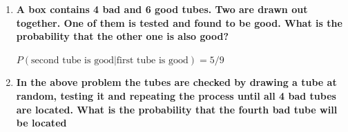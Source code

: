 \documentclass[10pt, oneside]{article}
\begin{document}
\begin{enumerate}[label=3.\arabic*]
\begin{enumerate}
	$\binom{1}{1} / \binom{4}{2} = \boxed{1/6}$
	
	\item  \begin{tcolorbox}[
	  colback=Cerulean!5!white,
	  colframe=Cerulean!75!black]
	\textbf{What is the probability that the last defective tube is obtained on the third test?}
	\end{tcolorbox}
	
	$\binom{2}{1} / \binom{4}{2} = \boxed{1/3}$
	
	\item  \begin{tcolorbox}[
	  colback=Cerulean!5!white,
	  colframe=Cerulean!75!black]
	\textbf{What is the probability that the last defective tube is obtained on the fourth test?}
	\end{tcolorbox}
	
	$\binom{3}{1} / \binom{4}{2} = \boxed{1/2}$
	
	\item  \begin{tcolorbox}[
	  colback=Cerulean!5!white,
	  colframe=Cerulean!75!black]
	\textbf{Add the numbers obtained for (a), (b), and (c) above. Is the result surprising?}
	\end{tcolorbox}
	
	$\boxed{1}$. No, by intuitively appealing to each of the outcomes as one partition collectively spanning the whole sample space.

	\end{enumerate}

\item  \begin{tcolorbox}[
  colback=Cerulean!5!white,
  colframe=Cerulean!75!black]
\textbf{A box contains 4 bad and 6 good tubes. Two are drawn out together. One of them is tested and found to be good. What is the probability that the other one is also good?}
\end{tcolorbox}

$P(\text{second tube is good} | \text{first tube is good}) = \boxed{5/9}$

\item  \begin{tcolorbox}[
  colback=Cerulean!5!white,
  colframe=Cerulean!75!black]
\textbf{In the above problem the tubes are checked by drawing a tube at random, testing it and repeating the process until all 4 bad tubes are located. What is the probability that the fourth bad tube will be located}
\end{tcolorbox}


\end{enumerate}
\end{document}
